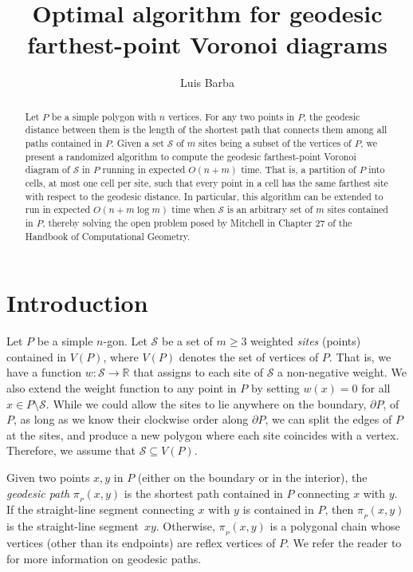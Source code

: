 \documentclass[a4paper,UKenglish]{socg-lipics-v2018}
\title{Optimal algorithm for geodesic farthest-point Voronoi diagrams}
\author{Luis Barba}{Department of Computer Science, ETH Z\"urich, Switzerland}{luis.barba@inf.ethz.ch}{}{}
\newcommand{\s}{\mathcal S}
\newcommand{\p}[3][P]{\ensuremath{\pi_{_{#1}}(#2, #3)}}
\begin{document}
\maketitle

\begin{abstract}
Let $P$ be a simple polygon with $n$ vertices.
For any two points in $P$, the geodesic distance between them is the length of the shortest path that connects them among all paths contained in $P$. 
Given a set $\s$ of $m$ sites being a subset of  the vertices of $P$, we present a randomized algorithm to compute the geodesic farthest-point Voronoi diagram of $\s$ in $P$ running in expected $O(n + m)$ time. 
That is, a partition of $P$ into cells, at most one cell per site, such that every point in a cell has the same farthest site with respect to the geodesic distance. 
In particular, this algorithm can be extended to run in expected $O(n + m\log m)$ time when $\s$ is an arbitrary set of $m$ sites contained in $P$, thereby solving the open problem posed by Mitchell in Chapter 27 of the Handbook of Computational Geometry.
\end{abstract}



\section{Introduction}
Let $P$ be a simple $n$-gon.
Let $\s$ be a set of $m\geq 3$ weighted \emph{sites} (points) contained in $V(P)$, where $V(P)$ denotes the set of vertices of $P$. 
That is, we have a function $w:\s\to \mathbb{R}$ that assigns to each site of $\s$ a non-negative weight. 
We also extend the weight function to any point in $P$ by setting $w(x) = 0$ for all $x\in P\setminus \s$.
While we could allow the sites to lie anywhere on the boundary, $\partial P$, of $P$, as long as we know their clockwise order along $\partial P$, we can split the edges of $P$ at the sites, and produce a new polygon where each site coincides with a vertex. Therefore, we assume that $\s\subseteq V(P)$.

Given two points $x,y$ in $P$ (either on the boundary or in the interior), the \emph{geodesic path} $\p{x}{y}$ is the shortest path contained in $P$ connecting $x$ with $y$. If the straight-line segment connecting $x$ with $y$ is contained in $P$, then $\p{x}{y}$ is the straight-line segment~$xy$. 
Otherwise, $\p{x}{y}$ is a polygonal chain whose vertices (other than its endpoints) are  reflex vertices of $P$. 
We refer the reader to~\cite{m-gspno-00} for more information on geodesic paths.
\end{document}
